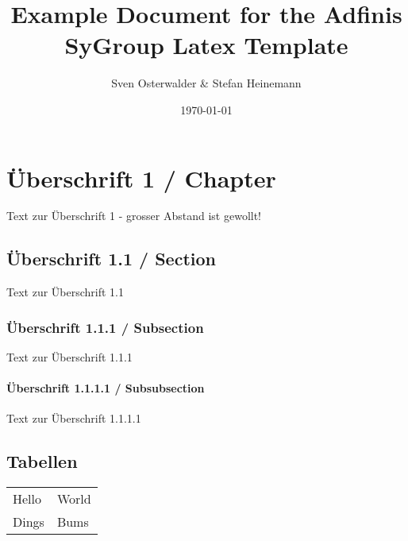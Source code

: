 \documentclass[oneside]{report}
\title{Example Document for the Adfinis SyGroup Latex Template}
\author{Sven Osterwalder \& Stefan Heinemann}
\date{\today}
\begin{document}
\maketitle{}
%

\tableofcontents{}

\chapter{Überschrift 1 / Chapter}

Text zur Überschrift 1 - grosser Abstand ist gewollt!

\section{Überschrift 1.1 / Section}

Text zur Überschrift 1.1

\subsection{Überschrift 1.1.1 / Subsection}

Text zur Überschrift 1.1.1

\subsubsection{Überschrift 1.1.1.1 / Subsubsection}

Text zur Überschrift 1.1.1.1


\section{Tabellen}

\begin{tabulary}{\linewidth}{l  l}
	Hello & World \\
	Dings & Bums \\
\end{tabulary}
\end{document}
